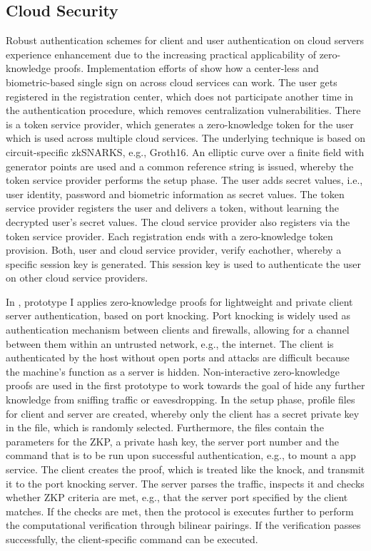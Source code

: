\subsection{Cloud Security}
Robust authentication schemes for client and user authentication on cloud servers experience enhancement due to the increasing practical applicability of zero-knowledge proofs. Implementation efforts of \citet{LiuWangPengXing} show how a center-less and biometric-based single sign on across cloud services can work. The user gets registered in the registration center, which does not participate another time in the authentication procedure, which removes centralization vulnerabilities. There is a token service provider, which generates a zero-knowledge token for the user which is used across multiple cloud services. The underlying technique is based on circuit-specific zkSNARKS, e.g., Groth16. An elliptic curve over a finite field with generator points are used and a common reference string is issued, whereby the token service provider performs the setup phase. The user adds secret values, i.e., user identity, password and biometric information as secret values. The token service provider registers the user and delivers a token, without learning the decrypted user's secret values. The cloud service provider also registers via the token service provider. Each registration ends with a zero-knowledge token provision. Both, user and cloud service provider, verify eachother, whereby a specific session key is generated. This session key is used to authenticate the user on other cloud service providers.  

In \citet{Major}, prototype I applies zero-knowledge proofs for lightweight and private client server authentication, based on port knocking. Port knocking is widely used as authentication mechanism between clients and firewalls, allowing for a channel between them within an untrusted network, e.g., the internet. The client is authenticated by the host without open ports and attacks are difficult because the machine's function as a server is hidden. Non-interactive zero-knowledge proofs are used in the first prototype to work towards the goal of hide any further knowledge from sniffing traffic or eavesdropping. In the setup phase, profile files for client and server are created, whereby only the client has a secret private key in the file, which is randomly selected. Furthermore, the files contain the parameters for the ZKP, a private hash key, the server port number and the command that is to be run upon successful authentication, e.g., to mount a app service. The client creates the proof, which is treated like the knock, and transmit it to the port knocking server. The server parses the traffic, inspects it and checks whether ZKP criteria are met, e.g., that the server port specified by the client matches. If the checks are met, then the protocol is executes further to perform the computational verification through bilinear pairings. If the verification passes successfully, the client-specific command can be executed.

